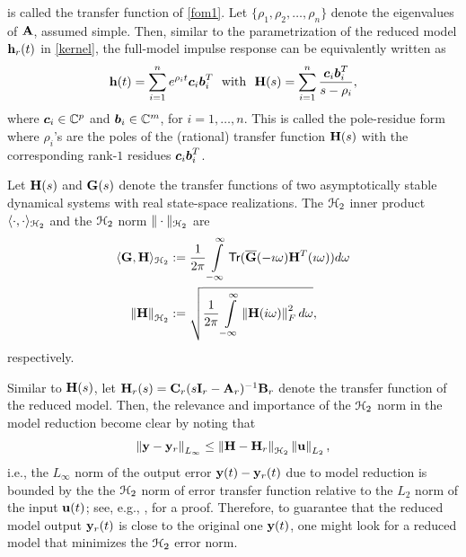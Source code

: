 \documentclass[twocolumn]{autart}
\begin{document}
is called the transfer function of \eqref{fom1}. Let $\{\rho_1,\rho_2,\ldots,\rho_n\}$ denote the eigenvalues of $\mathbf{A}$, assumed simple. Then, similar to the parametrization of the reduced model $\mathbf{h}_r(t)$ in \eqref{kernel}, the full-model impulse response can be equivalently written as 
\begin{equation} \label{eqn:hfull}
\mathbf{h}(t) = \sum_{i=1}^n e^{\rho_i t} \boldsymbol{c}_i \boldsymbol{b}_i^T~~\mbox{with}~~
\mathbf{H}(s) =\sum_{i=1}^n \frac{\boldsymbol{c}_i \boldsymbol{b}_i^T}{s-\rho_i},
\end{equation}
where $\boldsymbol{c}_i \in \mathbb{C}^{p}$ and $\boldsymbol{b}_i \in \mathbb{C}^m$, for $i=1,\ldots,n$.
This is called the pole-residue form where $\rho_i$'s are the poles of the (rational) transfer  function 
$\mathbf{H}(s)$ with the corresponding rank-$1$ residues $\boldsymbol{c}_i \boldsymbol{b}_i^T$.
\begin{Definition}
Let $\mathbf{H}(s)$ and $\mathbf{G}(s)$ denote the transfer functions  of two asymptotically stable  dynamical systems with real state-space realizations.
The $\EuScript{H}_2$ inner product $\langle \cdot, \cdot \rangle_{\EuScript{H}_2}$ 
and the $\EuScript{H}_2$ norm $\| \cdot \|_{\EuScript{H}_2}$ are
\begin{align*}
\langle \G, \HH \rangle_{\ch_2}&:=\dfrac{1}{2\pi}\int_{-\infty}^\infty \mathsf{Tr}(\overline{\G}(-\imath\omega)\HH^T(\imath\omega)) d\omega \\
\norm{ \HH}_{\ch_2}&:=\sqrt{\dfrac{1}{2\pi} \int_{-\infty}^\infty \norm{\HH(i\omega)}_F^2 d\omega},
\end{align*}
respectively.
\end{Definition}

Similar to $\mathbf{H}(s)$, let $\mathbf{H}_r(s)=\mathbf{C}_r(s\mathbf{I}_r-\mathbf{A}_r)^{-1}\mathbf{B}_r$ denote the transfer function of the reduced model. Then, the relevance and importance of the $\EuScript{H}_2$ norm in the model reduction become clear by noting that 
\begin{equation}
\begin{aligned}
\left\lVert\mathbf{y}-\mathbf{y}_r\right\rVert_{L_\infty}\leq\left\lVert\mathbf{H}-\mathbf{H}_r\right\rVert_{\EuScript{H}_2}\left\lVert\mathbf{u}\right\rVert_{L_2},
\end{aligned}
\end{equation}
i.e., the $L_\infty$ norm of the output error $\mathbf{y}(t)-\mathbf{y}_r(t)$ due to model reduction is bounded by the 
the $\EuScript{H}_2$ norm of error transfer function relative to the $L_2$ norm of the input $\mathbf{u}(t)$;
see, e.g.,  \cite{AntBG10b}, for a proof.
Therefore, to guarantee that the reduced model output $\mathbf{y}_r(t)$ is close to the original one $\mathbf{y}(t)$, one might look for a reduced model that minimizes the $\EuScript{H}_2$ error norm.
\end{document}
